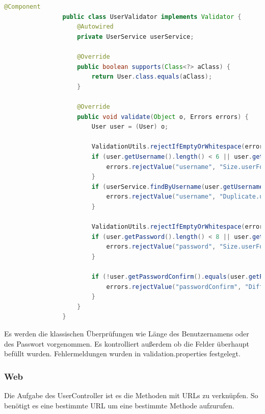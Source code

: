             \begin{lstlisting}[language = java]
                @Component
                public class UserValidator implements Validator {
                    @Autowired
                    private UserService userService;
                
                    @Override
                    public boolean supports(Class<?> aClass) {
                        return User.class.equals(aClass);
                    }
                
                    @Override
                    public void validate(Object o, Errors errors) {
                        User user = (User) o;
                
                        ValidationUtils.rejectIfEmptyOrWhitespace(errors, "username", "NotEmpty");
                        if (user.getUsername().length() < 6 || user.getUsername().length() > 32) {
                            errors.rejectValue("username", "Size.userForm.username");
                        }
                        if (userService.findByUsername(user.getUsername()) != null) {
                            errors.rejectValue("username", "Duplicate.userForm.username");
                        }
                
                        ValidationUtils.rejectIfEmptyOrWhitespace(errors, "password", "NotEmpty");
                        if (user.getPassword().length() < 8 || user.getPassword().length() > 32) {
                            errors.rejectValue("password", "Size.userForm.password");
                        }
                
                        if (!user.getPasswordConfirm().equals(user.getPassword())) {
                            errors.rejectValue("passwordConfirm", "Diff.userForm.passwordConfirm");
                        }
                    }
                }
            \end{lstlisting}
            
            Es werden die klassischen Überprüfungen wie Länge des Benutzernamens oder des Passwort vorgenommen. Es kontrolliert außerdem ob die Felder überhaupt befüllt wurden. Fehlermeldungen wurden in validation.properties festgelegt.
        
        \newpage
        
        \subsubsection{Web}
            Die Aufgabe des UserController ist es die Methoden mit URLs zu verknüpfen. So benötigt es eine bestimmte URL um eine bestimmte Methode aufzurufen.
            
